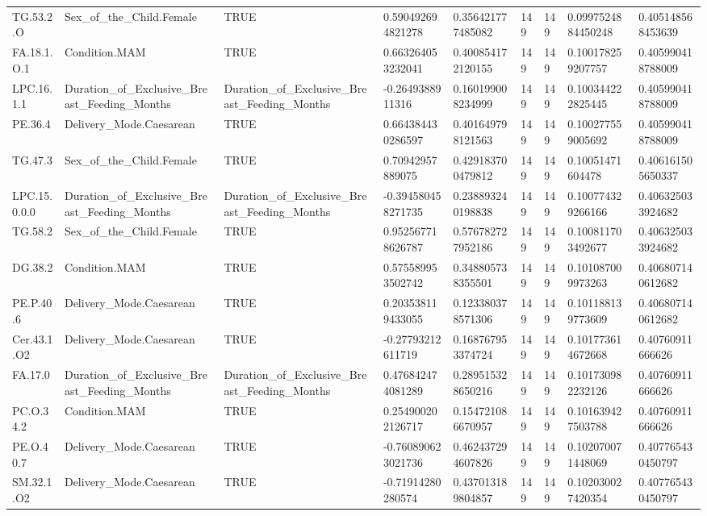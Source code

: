 \begin{longtable}{lllllllll}
TG.53.2.O & Sex\_of\_the\_Child.Female & TRUE & 0.590492694821278 & 0.356421777485082 & 149 & 149 & 0.0997524884450248 & 0.405148568453639 \\
FA.18.1.O.1 & Condition.MAM & TRUE & 0.663264053232041 & 0.400854172120155 & 149 & 149 & 0.100178259207757 & 0.405990418788009 \\
LPC.16.1.1 & Duration\_of\_Exclusive\_Breast\_Feeding\_Months & Duration\_of\_Exclusive\_Breast\_Feeding\_Months & -0.2649388911316 & 0.160199008234999 & 149 & 149 & 0.100344222825445 & 0.405990418788009 \\
PE.36.4 & Delivery\_Mode.Caesarean & TRUE & 0.664384430286597 & 0.401649798121563 & 149 & 149 & 0.100277559005692 & 0.405990418788009 \\
TG.47.3 & Sex\_of\_the\_Child.Female & TRUE & 0.70942957889075 & 0.429183700479812 & 149 & 149 & 0.10051471604478 & 0.406161505650337 \\
LPC.15.0.0.0 & Duration\_of\_Exclusive\_Breast\_Feeding\_Months & Duration\_of\_Exclusive\_Breast\_Feeding\_Months & -0.394580458271735 & 0.238893240198838 & 149 & 149 & 0.100774329266166 & 0.406325033924682 \\
TG.58.2 & Sex\_of\_the\_Child.Female & TRUE & 0.952567718626787 & 0.576782727952186 & 149 & 149 & 0.100811703492677 & 0.406325033924682 \\
DG.38.2 & Condition.MAM & TRUE & 0.575589953502742 & 0.348805738355501 & 149 & 149 & 0.101087009973263 & 0.406807140612682 \\
PE.P.40.6 & Delivery\_Mode.Caesarean & TRUE & 0.203538119433055 & 0.123380378571306 & 149 & 149 & 0.101188139773609 & 0.406807140612682 \\
Cer.43.1.O2 & Delivery\_Mode.Caesarean & TRUE & -0.27793212611719 & 0.168767953374724 & 149 & 149 & 0.101773614672668 & 0.40760911666626 \\
FA.17.0 & Duration\_of\_Exclusive\_Breast\_Feeding\_Months & Duration\_of\_Exclusive\_Breast\_Feeding\_Months & 0.476842474081289 & 0.289515328650216 & 149 & 149 & 0.101730982232126 & 0.40760911666626 \\
PC.O.34.2 & Condition.MAM & TRUE & 0.254900202126717 & 0.154721086670957 & 149 & 149 & 0.101639427503788 & 0.40760911666626 \\
PE.O.40.7 & Delivery\_Mode.Caesarean & TRUE & -0.760890623021736 & 0.462437294607826 & 149 & 149 & 0.102070071448069 & 0.407765430450797 \\
SM.32.1.O2 & Delivery\_Mode.Caesarean & TRUE & -0.71914280280574 & 0.437013189804857 & 149 & 149 & 0.102030027420354 & 0.407765430450797 \\

\end{longtable}
